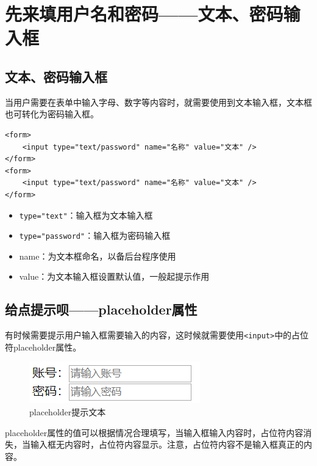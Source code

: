 \newpage

\section{先来填用户名和密码——文本、密码输入框}

\subsection{文本、密码输入框}

当用户需要在表单中输入字母、数字等内容时，就需要使用到文本输入框，文本框也可转化为密码输入框。 \\

\begin{lstlisting}[style=htmlcssjs]
<form>
    <input type="text/password" name="名称" value="文本" />
</form>
<form>
    <input type="text/password" name="名称" value="文本" />
</form>
\end{lstlisting}

\begin{itemize}
    \item \lstinline|type="text"|：输入框为文本输入框
    \item \lstinline|type="password"|：输入框为密码输入框
    \item name：为文本框命名，以备后台程序使用
    \item value：为文本输入框设置默认值，一般起提示作用
\end{itemize}

\subsection{给点提示呗——placeholder属性}

有时候需要提示用户输入框需要输入的内容，这时候就需要使用\lstinline|<input>|中的占位符placeholder属性。

\begin{figure}[H]
    \centering
    \includegraphics[]{img/C4/4-3/1.png}
    \caption{placeholder提示文本}
\end{figure}

placeholder属性的值可以根据情况合理填写，当输入框输入内容时，占位符内容消失，当输入框无内容时，占位符内容显示。注意，占位符内容不是输入框真正的内容。

